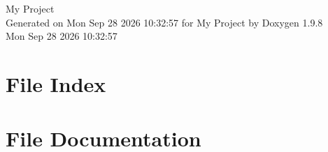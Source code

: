 \documentclass[twoside]{book}
\newcommand{\+}{\discretionary{\mbox{\scriptsize$\hookleftarrow$}}{}{}}
\newcommand{\clearemptydoublepage}{%
    \newpage{\pagestyle{empty}\cleardoublepage}%
  }
\begin{document}
  \raggedbottom
    \hypersetup{pageanchor=false,
                bookmarksnumbered=true,
                pdfencoding=unicode
               }
  \begin{titlepage}
  \vspace*{7cm}
  \begin{center}%
  {\Large My Project}\\
  \vspace*{1cm}
  {\large Generated on Mon Sep 28 2026 10\+:32\+:57 for My Project by Doxygen 1.9.8}\\
    \vspace*{0.5cm}
    {\small Mon Sep 28 2026 10:32:57}
  \end{center}
  \end{titlepage}
  \clearemptydoublepage
  \tableofcontents
  \clearemptydoublepage
  \hypersetup{pageanchor=true}

\chapter{File Index}

\chapter{File Documentation}


  \backmatter
  \newpage
  \clearemptydoublepage
  \printindex
\end{document}
